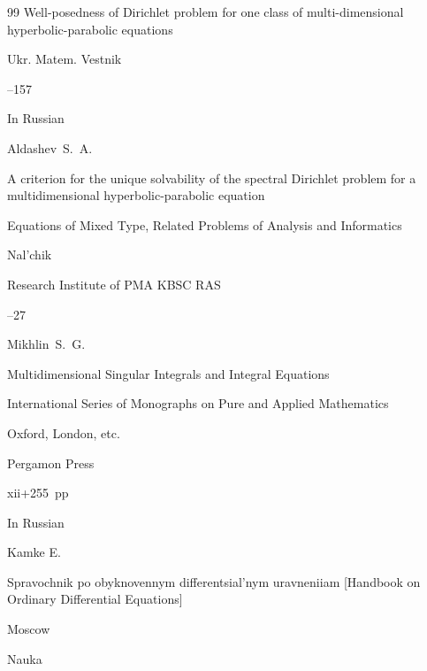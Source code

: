 \begin{thebibliography}{99}
\paper  Well-posedness of Dirichlet problem for one class of multi-dimensional hyperbolic-parabolic equations

\jour Ukr. Matem. Vestnik




--157




\lang In Russian

\by Aldashev~S.~A.

\paper A criterion for the unique solvability of the spectral Dirichlet problem for a multidimensional hyperbolic-parabolic equation

\inbook Equations of Mixed Type, Related Problems of Analysis and Informatics

\publaddr Nal'chik

\publ Research Institute of PMA KBSC RAS


--27




\by Mikhlin~S.~G.

\book Multidimensional Singular Integrals and Integral Equations


\serial International Series of Monographs on Pure and Applied Mathematics



\publaddr Oxford, London, etc.

\publ Pergamon Press

\totalpages xii+255~pp \nofrills





\lang In Russian

\by Kamke E.

\book  Spravochnik po obyknovennym differentsial'nym uravneniiam \rm [Handbook on Ordinary Differential Equations]

\publaddr Moscow

\publ Nauka






\end{thebibliography}
